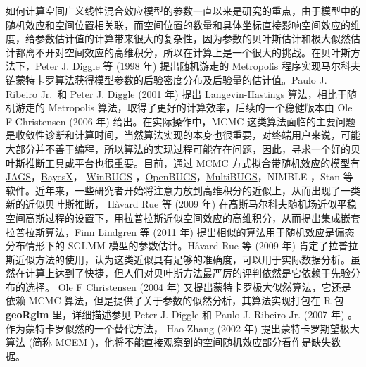 \documentclass[12pt,a4paper,UTF8,twoside]{book}
\theoremstyle{definition}
\theoremstyle{definition}
\theoremstyle{definition}
\theoremstyle{remark}
\begin{document}
如何计算空间广义线性混合效应模型的参数一直以来是研究的重点，由于模型中的随机效应和空间位置相关联，而空间位置的数量和具体坐标直接影响空间效应的维度，给参数估计值的计算带来很大的复杂性，因为参数的贝叶斯估计和极大似然估计都离不开对空间效应的高维积分，所以在计算上是一个很大的挑战。在贝叶斯方法下，Peter
J. Diggle 等 (1998 年) \citep{Diggle1998} 提出随机游走的 Metropolis
程序实现马尔科夫链蒙特卡罗算法获得模型参数的后验密度分布及后验量的估计值。Paulo
J. Ribeiro Jr.~和 Peter J. Diggle (2001 年) \citep{geoR2001} 提出
Langevin-Hastings 算法，相比于随机游走的 Metropolis
算法，取得了更好的计算效率，后续的一个稳健版本由 Ole F Christensen (2006
年) \citep{Christensen2006} 给出。在实际操作中，MCMC
这类算法面临的主要问题是收敛性诊断和计算时间，当然算法实现的本身也很重要，对终端用户来说，可能大部分并不善于编程，所以算法的实现过程可能存在问题，因此，寻求一个好的贝叶斯推断工具或平台也很重要。目前，通过
MCMC 方式拟合带随机效应的模型有
\href{http://mcmc-jags.sourceforge.net/}{JAGS}，\href{http://www.BayesX.org}{BayesX}，
\href{http://www.mrc-bsu.cam.ac.uk/software/bugs/the-bugs-project-winbugs/}{WinBUGS}
\citep{BUGS2009}，\href{http://www.openbugs.net/}{OpenBUGS}，\href{https://www.multibugs.org}{MultiBUGS}，NIMBLE
\citep{nimble2017}，Stan \citep{Stan2017JSS}
等软件。近年来，一些研究者开始将注意力放到高维积分的近似上，从而出现了一类新的近似贝叶斯推断，
Håvard Rue 等 (2009 年) \citep{Rue2009}
在高斯马尔科夫随机场近似平稳空间高斯过程的设置下，用拉普拉斯近似空间效应的高维积分，从而提出集成嵌套拉普拉斯算法，Finn
Lindgren 等 (2011 年) \citep{Lindgren2011}
提出相似的算法用于随机效应是偏态分布情形下的 SGLMM
模型的参数估计。Håvard Rue 等 (2009 年) \citep{Rue2009}
肯定了拉普拉斯近似方法的使用，认为这类近似具有足够的准确度，可以用于实际数据分析。虽然在计算上达到了快捷，但人们对贝叶斯方法最严厉的评判依然是它依赖于先验分布的选择。
Ole F Christensen (2004 年) \citep{Christensen2004}
又提出蒙特卡罗极大似然算法，它还是依赖 MCMC
算法，但是提供了关于参数的似然分析，其算法实现打包在 R 包
\textbf{geoRglm} 里，详细描述参见 Peter J. Diggle 和 Paulo J. Ribeiro
Jr. (2007 年) \citep{Diggle2007}。作为蒙特卡罗似然的一个替代方法， Hao
Zhang (2002 年) 提出蒙特卡罗期望极大算法 (简称 MCEM
)，他将不能直接观察到的空间随机效应部分看作是缺失数据。
\end{document}
